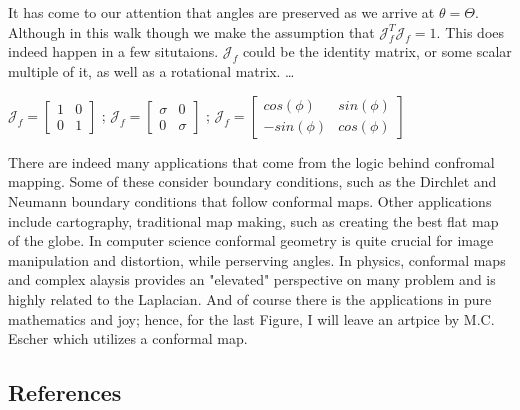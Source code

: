\documentclass[a4paper,man,natbib]{apa6}
\begin{document}
It has come to our attention that angles are preserved as we arrive at $ \theta = \Theta $.
Although in this walk though we make the assumption that $ \mathcal{J}_f^T\mathcal{J}_f = 1 $. 
This does indeed happen in a few situtaions. $ \mathcal{J}_f $ could be the identity matrix, or some scalar multiple of it, as well as a rotational matrix. \dots

\begin{center}

$ \mathcal{J}_f = \begin{bmatrix}
        1 & 0\\
        0 & 1
\end{bmatrix} $ ;
$ \mathcal{J}_f = \begin{bmatrix}
      \sigma  & 0\\
      0 & \sigma 
\end{bmatrix} $ ;
$ \mathcal{J}_f = \begin{bmatrix}
      cos(\phi) & sin(\phi)\\
      -sin(\phi) & cos(\phi)
\end{bmatrix} $

\end{center}

There are indeed many applications that come from the logic behind confromal mapping. 
Some of these consider boundary conditions, such as the Dirchlet and Neumann boundary conditions that follow conformal maps. 
Other applications include cartography, traditional map making, such as creating the best flat map of the globe. 
In computer science conformal geometry is quite crucial for image manipulation and distortion, while perserving angles. 
In physics, conformal maps and complex alaysis provides an "elevated" perspective on many problem and is highly related to the Laplacian. 
And of course there is the applications in pure mathematics and joy; hence, for the last Figure, I will leave an artpice by M.C. Escher which utilizes a conformal map. 

\newpage
\subsection{References}
\end{document}
